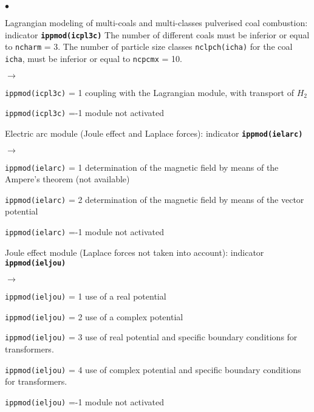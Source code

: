 {{\begin{list}{$\bullet$}{}
        \item Lagrangian modeling of multi-coals and
             multi-classes pulverised coal combustion:
                 indicator {\bf \tt ippmod(icpl3c)}
              The number of different coals must be inferior or equal to
              \texttt{ncharm} = 3. The number of particle size
             classes \texttt{nclpch(icha)} for the coal
             \texttt{icha}, must be inferior or equal to
             \texttt{ncpcmx} = 10.
         \begin{list}{$\rightarrow$}{}
                \item \texttt{ippmod(icpl3c)} = 1 coupling with the Lagrangian
                      module, with transport of $H_2$
                \item \texttt{ippmod(icpl3c)} =-1 module not activated
         \end{list}
       \item Electric arc module (Joule effect and Laplace forces):
             indicator {\bf \tt ippmod(ielarc)}
        \begin{list}{$\rightarrow$}{}
               \item \texttt{ippmod(ielarc)} = 1 determination of the magnetic field by
                     means of the Ampere's theorem (not available)
               \item \texttt{ippmod(ielarc)} = 2 determination of the magnetic
                     field by means of the vector potential
               \item \texttt{ippmod(ielarc)} =-1 module not activated
         \end{list}
       \item Joule effect module (Laplace forces not taken into account):
             indicator {\bf \tt ippmod(ieljou)}
        \begin{list}{$\rightarrow$}{}
               \item \texttt{ippmod(ieljou)} = 1 use of a real potential
               \item \texttt{ippmod(ieljou)} = 2 use of a complex potential
               \item \texttt{ippmod(ieljou)} = 3 use of real potential and specific boundary conditions for transformers.
               \item \texttt{ippmod(ieljou)} = 4 use of complex potential and specific boundary conditions for transformers.
               \item \texttt{ippmod(ieljou)} =-1 module not activated

\end{list}
\end{list}}}
